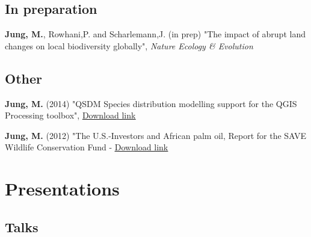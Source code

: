 \documentclass[12pt,a4paper,serif]{moderncv}        %
\begin{document}
\vspace{8pt}

\subsection{In preparation}
\vspace{2pt}
\begin{bibenum}

 \item[] \textbf{Jung, M.}, Rowhani,P. and Scharlemann,J. (in prep) "The impact of abrupt land changes on local biodiversity globally", \emph{Nature Ecology \& Evolution}

\end{bibenum}

\vspace{8pt}
\subsection{Other}
\vspace{2pt}
\begin{bibenum}

  \item[] \textbf{Jung, M.} (2014) "QSDM Species distribution modelling support for the QGIS Processing toolbox", \href{http://plugins.qgis.org/plugins/QSDM/}{\underline{Download link}}
  
  \item[] \textbf{Jung, M.} (2012) "The U.S.-Investors and African palm oil, Report for the SAVE Wildlife Conservation Fund - \href{http://www.save-wildlife.com/downloads/save_the_forest/us_investors_and_african_palm_oil.pdf}{\underline{Download link}}

\end{bibenum}


\section{Presentations}

\subsection{Talks}
\vspace{6pt}
\end{document}
